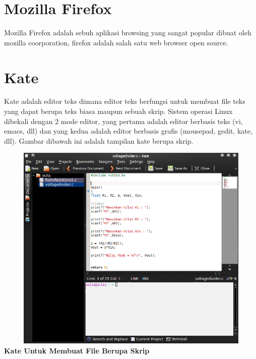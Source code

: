 \documentclass[11pt,fleqn]{book} %
\begin{document}
\section{Mozilla Firefox}
\hspace{10pt}Mozilla Firefox adalah sebuh aplikasi browsing yang sangat popular dibuat oleh mozilla coorporation, firefox adalah salah satu web browser open source. 
\section{Kate}
\hspace{10pt} Kate adalah editor teks dimana editor teks berfungsi untuk membuat file teks yang dapat berupa teks biasa maupun sebuah skrip. 
Sistem operasi Linux dibekali dengan 2 mode editor, yang pertama adalah editor berbasis teks (vi, emacs, dll) dan yang kedua adalah editor berbasis grafis (mousepad, gedit, kate, dll). 
Gambar dibawah ini adalah tampilan kate berupa skrip.\\
\begin{center}
\includegraphics[width=14cm,height=10cm]{kate.png}\\
\textbf{Kate Untuk Membuat File Berupa Skrip}\\
\end{center}
\end{document}
